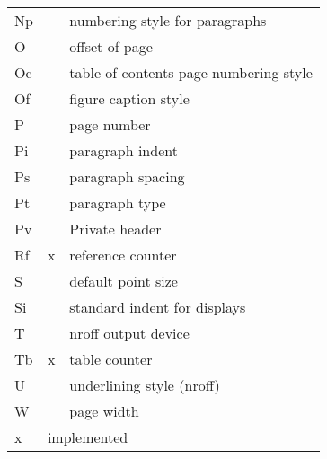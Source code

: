 \begin{center}
\begin{tabular}{|l|c|l|}
Np&	&		numbering style for paragraphs\\
O&	&		offset of page\\
Oc&	&		table of contents page numbering style\\
Of&	&		figure caption style\\
P&	&		page number\\
Pi&	&		paragraph indent\\
Ps&	&		paragraph spacing\\
Pt&	&		paragraph type\\
Pv&	&		Private header\\
Rf&	x&		reference counter\\
S&	&		default point size\\
Si&	&		standard indent for displays\\
T&	&		nroff output device\\
Tb&	x&		table counter\\
U&	&		underlining style (nroff)\\
W&	&		page width\\
\hline\hline
x&\multicolumn{2}{|l|}{implemented}\\
\hline
\end{tabular}
\end{center}
\medskip

